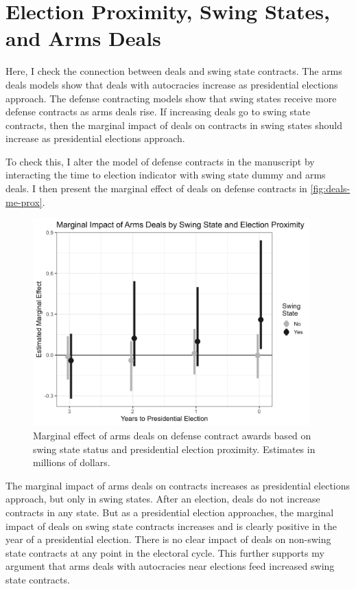 \documentclass[12pt]{article}
\begin{document}
\newpage 

\section{Election Proximity, Swing States, and Arms Deals}

Here, I check the connection between deals and swing state contracts. 
The arms deals models show that deals with autocracies increase as presidential elections approach. 
The defense contracting models show that swing states receive more defense contracts as arms deals rise.
If increasing deals go to swing state contracts, then the marginal impact of deals on contracts in swing states should increase as presidential elections approach. 


To check this, I alter the model of defense contracts in the manuscript by interacting the time to election indicator with swing state dummy and arms deals. 
I then present the marginal effect of deals on defense contracts in \autoref{fig:deals-me-prox}. 


\begin{figure}[htpb]
	\centering
		\includegraphics[width=0.95\textwidth]{deals-me-prox.png}
	\caption{Marginal effect of arms deals on defense contract awards based on swing state status and presidential election proximity. Estimates in millions of dollars.}
	\label{fig:deals-me-prox}
\end{figure}


The marginal impact of arms deals on contracts increases as presidential elections approach, but only in swing states. 
After an election, deals do not increase contracts in any state. 
But as a presidential election approaches, the marginal impact of deals on swing state contracts increases and is clearly positive in the year of a presidential election. 
There is no clear impact of deals on non-swing state contracts at any point in the electoral cycle. 
This further supports my argument that arms deals with autocracies near elections feed increased swing state contracts. 
\end{document}
